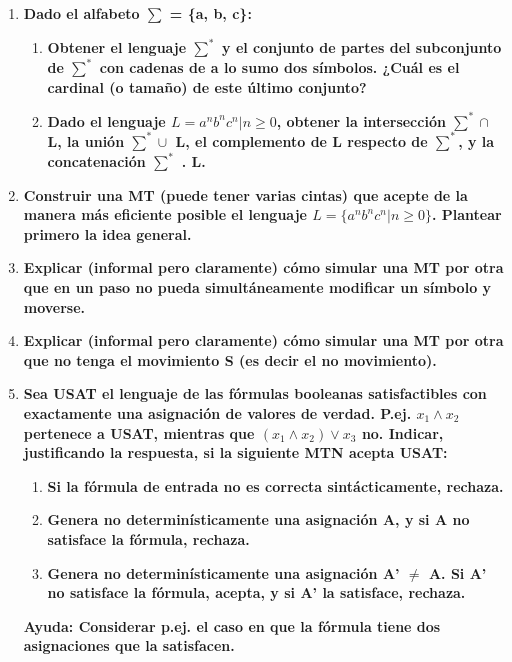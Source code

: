 \documentclass{article}
\begin{document}
\begin{enumerate}
\item \textbf{ Dado el alfabeto $\sum$ = \{a, b, c\}:}

\begin{enumerate}

    \item \textbf{ Obtener el lenguaje $\sum^*$ y el conjunto de partes del subconjunto de $\sum^*$ con cadenas de a lo
sumo dos símbolos. ¿Cuál es el cardinal (o tamaño) de este último conjunto?  }

\item \textbf{Dado el lenguaje $L = {a^n b^n c^n | n \geq 0}$, 
obtener la intersección 
$\sum^* \cap$ L, la unión $\sum^* \cup$ L, el
complemento de L respecto de $\sum^*$, 
y la concatenación $\sum^*$ . L.}

\end{enumerate}

\item \textbf{ Construir una MT (puede tener varias cintas) que acepte de la manera más eficiente
posible el lenguaje $L = \{a^n b^n c^n | n \geq 0\}$. Plantear primero la idea general.}

\item \textbf{Explicar (informal pero claramente) cómo simular una MT por otra que en un paso
no pueda simultáneamente modificar un símbolo y moverse.}

\item \textbf{Explicar (informal pero claramente) cómo simular una MT por otra que no tenga el
movimiento S (es decir el no movimiento).}

\item \textbf{Sea USAT el lenguaje de las fórmulas booleanas satisfactibles con exactamente una
asignación de valores de verdad. P.ej. $x_1 \wedge x_2$ pertenece a USAT, mientras que $(x_1 \wedge x_2) \vee x_3$ no.
Indicar, justificando la respuesta, si la siguiente MTN acepta USAT: }

\begin{enumerate}
\item \textbf{Si la fórmula de entrada no es correcta sintácticamente, rechaza.}
\item \textbf{ Genera no determinísticamente una asignación A, y si A no satisface la fórmula, rechaza.}
\item \textbf{Genera no determinísticamente una asignación A’ $\neq$ A. Si A’ no satisface la fórmula, acepta,
y si A’ la satisface, rechaza.}
\end{enumerate}

\textbf{Ayuda: Considerar p.ej. el caso en que la fórmula tiene dos asignaciones que la satisfacen.
}


\end{enumerate}
\end{document}
